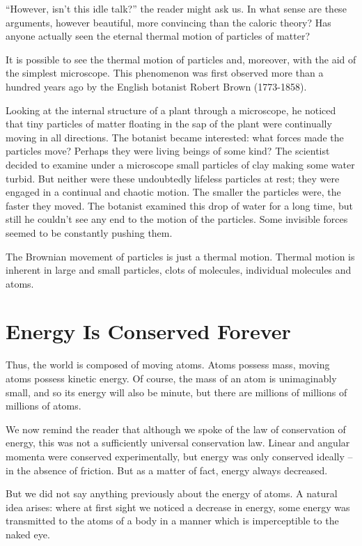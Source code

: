 ``However, isn’t this idle talk?'' the reader might ask us. In what sense are these arguments, however beautiful, more convincing than the caloric theory? Has anyone actually seen the eternal thermal motion of particles of matter?

It is possible to see the thermal motion of particles and, moreover, with the aid of the simplest microscope. This phenomenon was first observed more than a hundred years ago by the English botanist Robert Brown (1773-1858).

Looking at the internal structure of a plant through a microscope, he noticed that tiny particles of matter floating in the sap of the plant were continually moving in all directions. The botanist became interested: what forces made the particles move? Perhaps they were living beings of some kind? The scientist decided to examine under a microscope small particles of clay making some water turbid. But neither were these un­doubtedly lifeless particles at rest; they were engaged in a continual and chaotic motion. The smaller the particles were, the faster they moved. The botanist examined this drop of water for a long time, but still he couldn’t see any end to the motion of the particles. Some invisible forces seemed to be constantly pushing them.

The Brownian movement of particles is just a thermal motion. Thermal motion is inherent in large and small particles, clots of molecules, individual molecules and atoms.


\section{Energy Is Conserved Forever}

Thus, the world is composed of moving atoms. Atoms possess mass, moving atoms possess kinetic energy. Of course, the mass of an atom is unimaginably small, and so its energy will also be minute, but there are millions of millions of millions of atoms.

We now remind the reader that although we spoke of the law of conservation of energy, this was not a sufficiently universal conservation law. Linear and angular momenta were conserved experimentally, but energy was only conserved ideally -- in the absence of friction. But as a matter of fact, energy always decreased.

But we did not say anything previously about the energy of atoms. A natural idea arises: where at first sight we noticed a decrease in energy, some energy was transmitted to the atoms of a body in a manner which is imperceptible to the naked eye.

